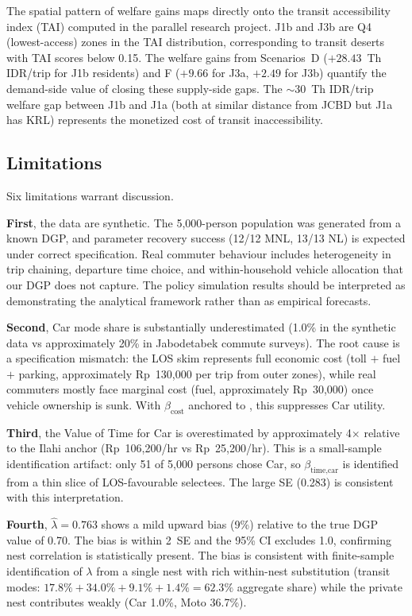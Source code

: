 \documentclass[12pt,a4paper]{article}
\begin{document}
The spatial pattern of welfare gains maps directly onto the transit accessibility index (TAI) computed in the parallel research project. J1b and J3b are Q4 (lowest-access) zones in the TAI distribution, corresponding to transit deserts with TAI scores below 0.15. The welfare gains from Scenarios~D ($+28.43$~Th IDR/trip for J1b residents) and F ($+9.66$ for J3a, $+2.49$ for J3b) quantify the demand-side value of closing these supply-side gaps. The $\sim$30~Th IDR/trip welfare gap between J1b and J1a (both at similar distance from JCBD but J1a has KRL) represents the monetized cost of transit inaccessibility.

\subsection{Limitations}

Six limitations warrant discussion.

\textbf{First}, the data are synthetic. The 5,000-person population was generated from a known DGP, and parameter recovery success (12/12 MNL, 13/13 NL) is expected under correct specification. Real commuter behaviour includes heterogeneity in trip chaining, departure time choice, and within-household vehicle allocation that our DGP does not capture. The policy simulation results should be interpreted as demonstrating the analytical framework rather than as empirical forecasts.

\textbf{Second}, Car mode share is substantially underestimated (1.0\% in the synthetic data vs approximately 20\% in Jabodetabek commute surveys). The root cause is a specification mismatch: the LOS skim represents full economic cost (toll $+$ fuel $+$ parking, approximately Rp~130,000 per trip from outer zones), while real commuters mostly face marginal cost (fuel, approximately Rp~30,000) once vehicle ownership is sunk. With $\beta_{\text{cost}}$ anchored to \citet{ilahi2021}, this suppresses Car utility.

\textbf{Third}, the Value of Time for Car is overestimated by approximately 4$\times$ relative to the Ilahi anchor (Rp~106,200/hr vs Rp~25,200/hr). This is a small-sample identification artifact: only 51 of 5,000 persons chose Car, so $\beta_{\text{time,car}}$ is identified from a thin slice of LOS-favourable selectees. The large SE (0.283) is consistent with this interpretation.

\textbf{Fourth}, $\hat{\lambda} = 0.763$ shows a mild upward bias (9\%) relative to the true DGP value of 0.70. The bias is within 2~SE and the 95\% CI excludes 1.0, confirming nest correlation is statistically present. The bias is consistent with finite-sample identification of $\lambda$ from a single nest with rich within-nest substitution (transit modes: $17.8\% + 34.0\% + 9.1\% + 1.4\% = 62.3\%$ aggregate share) while the private nest contributes weakly (Car 1.0\%, Moto 36.7\%).
\end{document}
